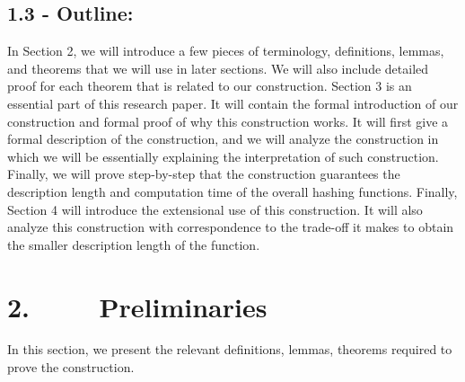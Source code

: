 \documentclass[a4paper, english]{paper}
\begin{document}
	\subsection{1.3 - Outline:} 
\quad	In Section 2, we will introduce a few pieces of terminology, definitions, lemmas, and theorems that we will use in later sections. We will also include detailed proof for each theorem that is related to our construction. Section 3 is an essential part of this research paper. It will contain the formal introduction of our construction and formal proof of why this construction works. It will first give a formal description of the construction, and we will analyze the construction in which we will be essentially explaining the interpretation of such construction. Finally, we will prove step-by-step that the construction guarantees the description length and computation time of the overall hashing functions. Finally, Section 4 will introduce the extensional use of this construction. It will also analyze this construction with correspondence to the trade-off it makes to obtain the smaller description length of the function. \\
	
	\section{2. $\qquad$ Preliminaries}
\quad	In this section, we present the relevant definitions, lemmas, theorems required to prove the construction.  \\
	
\end{document}
